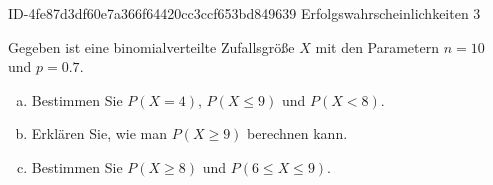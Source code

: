 \begin{exercise}
      {ID-4fe87d3df60e7a366f64420cc3ccf653bd849639}
      {Erfolgswahrscheinlichkeiten 3}
  \ifproblem\problem\par
    Gegeben ist eine binomialverteilte Zufallsgröße $X$ mit den Parametern
    $n=10$ und $p=\num{0.7}$.
    \begin{enumerate}[a)]
      \item Bestimmen Sie $P(X=4)$, $P(X\leq9)$ und $P(X<8)$.
      \item Erklären Sie, wie man $P(X\geq9)$ berechnen kann.
      \item Bestimmen Sie $P(X\geq8)$ und $P(6\leq X\leq9)$.
    \end{enumerate}
  \fi
\end{exercise}
